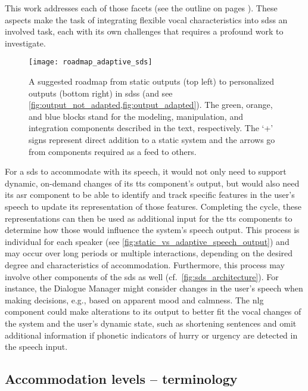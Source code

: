 This work addresses each of those facets (see the outline on pages ).
These aspects make the task of integrating flexible vocal characteristics into \acp{sds} an involved task, each with its own challenges that requires a profound work to investigate.
%
\begin{figure}[t]
	\centering
	\texttt{[image: roadmap\_adaptive\_sds]}
	\caption[Roadmap to phonetically adaptive \acl{sds}]
		{A suggested roadmap from static outputs (top left) to personalized outputs (bottom right) in \acp{sds} (and see \cref{fig:output_not_adapted,fig:output_adapted}).
		The green, orange, and blue blocks stand for the modeling, manipulation, and integration components described in the text, respectively.
		The \enquote*{+} signs represent direct addition to a static system and the arrows go from components required as a feed to others.}
	\label{fig:roadmap_adaptive_sds}
\end{figure}
%
For a \ac{sds} to accommodate with its speech, it would not only need to support dynamic, on-demand changes of its \ac{tts} component's output, but would also need its \ac{asr} component to be able to identify and track specific features in the user's speech to update its representation of those features.
Completing the cycle, these representations can then be used as additional input for the \ac{tts} components to determine how those would influence the system's speech output.
This process is individual for each speaker (see \cref{fig:static_vs_adaptive_speech_output}) and may occur over long periods or multiple interactions, depending on the desired degree and characteristics of accommodation.
Furthermore, this process may involve other components of the \ac{sds} as well (cf.\ \cref{fig:sds_architecture}).
For instance, the Dialogue Manager might consider changes in the user's speech when making decisions, e.g., based on apparent mood and calmness.
The \ac{nlg} component could make alterations to its output to better fit the vocal changes of the system and the user's dynamic state, such as shortening sentences and omit additional information if phonetic indicators of hurry or urgency \citep[like those shown by][]{Edworthy2003acoustic} are detected in the speech input.

\subsection{Accommodation levels -- terminology}
\label{subsec:accommodation_levels}

